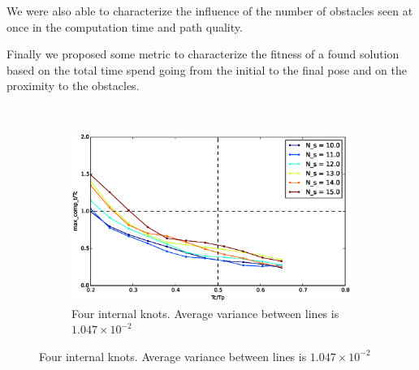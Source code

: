 We were also able to characterize the influence of the number of obstacles seen at once in the computation time and path quality.

Finally we proposed some metric to characterize the fitness of a found solution based on the total time spend going from the initial to the final pose and on the proximity to the obstacles.


\begin{figure}[!h]
        \centering
        ~ %
        \begin{subfigure}[b]{0.48\textwidth}
                \includegraphics[width=\textwidth]{./images/realtime/Scenario_3__N_knots_4/mcttc-tctp.eps}
                \caption{Four internal knots. Average variance between lines is $1.047\times 10^{-2}$}\label{fig:uni34}
        \end{subfigure}
        

\end{figure}
